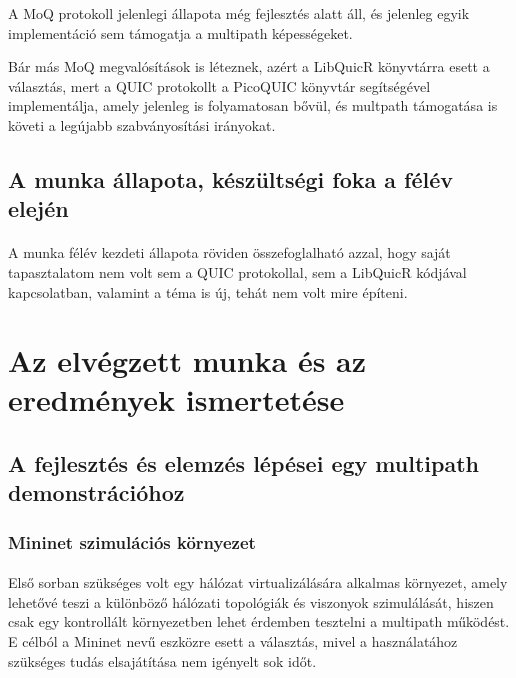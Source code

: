 \documentclass[a4paper,oneside]{article}
\begin{document}
A MoQ protokoll jelenlegi állapota még fejlesztés alatt áll, és jelenleg egyik implementáció
sem támogatja a multipath képességeket.

Bár más MoQ megvalósítások is léteznek, azért a LibQuicR könyvtárra esett a
választás, mert a QUIC protokollt a PicoQUIC könyvtár segítségével implementálja, amely
jelenleg is folyamatosan bővül, és multpath támogatása is követi a legújabb szabványosítási irányokat.

\subsection{A munka állapota, készültségi foka a félév elején}
\label{sec:munka-allap-kesz}
\paragraph{}
A munka félév kezdeti állapota röviden összefoglalható azzal, 
hogy saját tapasztalatom nem volt sem a QUIC protokollal, sem a LibQuicR
kódjával kapcsolatban, valamint a téma is új, tehát nem volt mire építeni.

\newpage
\section{Az elvégzett munka és az eredmények ismertetése}
\label{sec:az-elvegzett-munka}


\subsection{A fejlesztés és elemzés lépései egy multipath demonstrációhoz}
\label{sec:a-munkam-ismert}

\subsubsection{Mininet szimulációs környezet}

 \paragraph{}

 Első sorban szükséges volt egy hálózat virtualizálására alkalmas környezet,
amely lehetővé teszi a különböző hálózati topológiák és viszonyok szimulálását, 
hiszen csak egy kontrollált környezetben 
lehet érdemben tesztelni a multipath működést. 
E célból a Mininet nevű eszközre esett a választás, mivel a használatához szükséges 
tudás elsajátítása nem igényelt sok időt.
\end{document}
